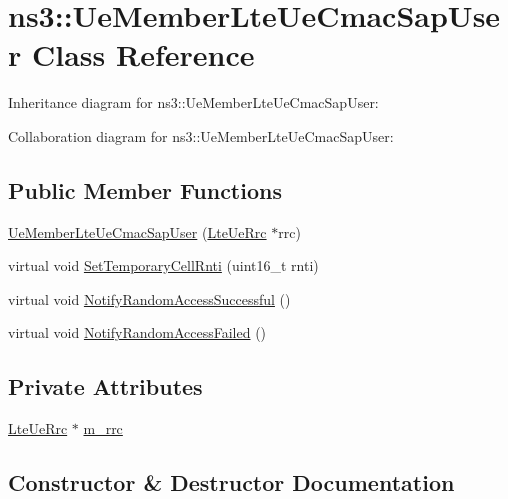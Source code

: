 \hypertarget{classns3_1_1UeMemberLteUeCmacSapUser}{}\section{ns3\+:\+:Ue\+Member\+Lte\+Ue\+Cmac\+Sap\+User Class Reference}
\label{classns3_1_1UeMemberLteUeCmacSapUser}


Inheritance diagram for ns3\+:\+:Ue\+Member\+Lte\+Ue\+Cmac\+Sap\+User\+:


Collaboration diagram for ns3\+:\+:Ue\+Member\+Lte\+Ue\+Cmac\+Sap\+User\+:
\subsection*{Public Member Functions}
\begin{DoxyCompactItemize}
\item 
\hyperlink{classns3_1_1UeMemberLteUeCmacSapUser_a105028015d8090167968b329f0487f78}{Ue\+Member\+Lte\+Ue\+Cmac\+Sap\+User} (\hyperlink{classns3_1_1LteUeRrc}{Lte\+Ue\+Rrc} $\ast$rrc)
\item 
virtual void \hyperlink{classns3_1_1UeMemberLteUeCmacSapUser_af26d53d2b50990bcc96ff407dc8e0010}{Set\+Temporary\+Cell\+Rnti} (uint16\+\_\+t rnti)
\item 
virtual void \hyperlink{classns3_1_1UeMemberLteUeCmacSapUser_a05cd8f87612e4b7044b12c8b062de00b}{Notify\+Random\+Access\+Successful} ()
\item 
virtual void \hyperlink{classns3_1_1UeMemberLteUeCmacSapUser_adb702d5107fb086a478363f1f93ed0e9}{Notify\+Random\+Access\+Failed} ()
\end{DoxyCompactItemize}
\subsection*{Private Attributes}
\begin{DoxyCompactItemize}
\item 
\hyperlink{classns3_1_1LteUeRrc}{Lte\+Ue\+Rrc} $\ast$ \hyperlink{classns3_1_1UeMemberLteUeCmacSapUser_a2acd8180fcf260a93ddffc12131c6366}{m\+\_\+rrc}
\end{DoxyCompactItemize}


\subsection{Constructor \& Destructor Documentation}

